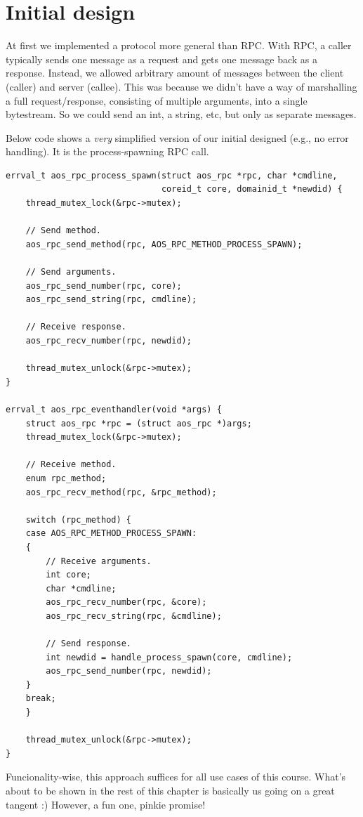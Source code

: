 \section{Initial design}
At first we implemented a protocol more general than RPC. With RPC, a caller typically sends one message as a request and gets one message back as a response. Instead, we allowed arbitrary amount of messages between the client (caller) and server (callee).
This was because we didn't have a way of marshalling a full request/response, consisting of multiple arguments, into a single bytestream. So we could send an int, a string, etc, but only as separate messages.

Below code shows a \emph{very} simplified version of our initial designed (e.g., no error handling). It is the process-spawning RPC call.

\begin{verbatim}
errval_t aos_rpc_process_spawn(struct aos_rpc *rpc, char *cmdline,
                               coreid_t core, domainid_t *newdid) {
    thread_mutex_lock(&rpc->mutex);
    
    // Send method.
    aos_rpc_send_method(rpc, AOS_RPC_METHOD_PROCESS_SPAWN);
    
    // Send arguments.
    aos_rpc_send_number(rpc, core);
    aos_rpc_send_string(rpc, cmdline);
    
    // Receive response.
    aos_rpc_recv_number(rpc, newdid);

    thread_mutex_unlock(&rpc->mutex);
}

errval_t aos_rpc_eventhandler(void *args) {
    struct aos_rpc *rpc = (struct aos_rpc *)args;
    thread_mutex_lock(&rpc->mutex);
        
    // Receive method.
    enum rpc_method;
    aos_rpc_recv_method(rpc, &rpc_method);
    
    switch (rpc_method) {
    case AOS_RPC_METHOD_PROCESS_SPAWN:
    {
        // Receive arguments.
        int core;
        char *cmdline;
        aos_rpc_recv_number(rpc, &core);
        aos_rpc_recv_string(rpc, &cmdline);
        
        // Send response.
        int newdid = handle_process_spawn(core, cmdline);
        aos_rpc_send_number(rpc, newdid);
    }
    break;
    }
    
    thread_mutex_unlock(&rpc->mutex);
}
\end{verbatim}

Funcionality-wise, this approach suffices for all use cases of this course. What's about to be shown in the rest of this chapter is basically us going on a great tangent :) However, a fun one, pinkie promise!

